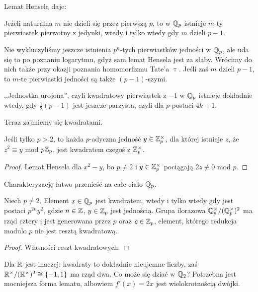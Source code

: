 Lemat Hensela daje:

\begin{fakt}
	Jeżeli naturalna $m$ nie dzieli się przez pierwszą $p$, to w $\mathbb Q_p$ istnieje $m$-ty pierwiastek pierwotny z jedynki, wtedy i tylko wtedy gdy $m$ dzieli $p-1$.
\end{fakt}

Nie wykluczyliśmy jeszcze istnienia $p^n$-tych pierwiastków jedności w $\mathbb Q_p$, ale uda się to po poznaniu logarytmu, gdyż sam lemat Hensela jest za słaby.
Wrócimy do nich także przy okazji poznania homomorfizmu Tate'a $\uptau$.
Jeśli zaś $m$ dzieli $p-1$, to $m$-te pierwiastki jedności są także $(p-1)$-szymi.

,,Jednostka urojona'',  czyli kwadratowy pierwiastek z $-1$ w $\mathbb Q_p$ istnieje dokładnie wtedy, gdy $\frac 1 2(p-1)$ jest jeszcze parzysta, czyli dla $p$ postaci $4k+1$.

Teraz zajmiemy się kwadratami.

\begin{fakt}
	Jeśli tylko $p > 2$, to każda $p$-adyczna jedność $y \in \mathbb Z_p^\times$, dla której istnieje $z$, że $z^2 \equiv y$ mod $p \mathbb Z_p$, jest kwadratem czegoś z $\mathbb Z_p^\times$.
\end{fakt}

\begin{proof}
	Lemat Hensela dla $x^2 - y$, bo $p \neq 2$ i $y \in \mathbb Z_p^\times$ pociągają $2 z \not\equiv 0$ mod $p$.
\end{proof}

Charakteryzację łatwo przenieść na całe ciało $\mathbb Q_p$.

\begin{wniosek}
	Niech  $p \neq 2$. 
	Element $x \in \mathbb Q_p$ jest kwadratem, wtedy i tylko wtedy gdy jest postaci $p^{2n} y^2$, gdzie $n \in \mathbb Z$, $y \in \mathbb Z_p$ jest jednością.
	Grupa ilorazowa $\mathbb Q_p^\times / (\mathbb Q_p^\times)^2$ ma rząd cztery i jest generowana przez $p$ oraz $c \in \mathbb Z_p$, element, którego redukcja modulo $p$ nie jest resztą kwadratową.
\end{wniosek}

\begin{proof}
	Własności reszt kwadratowych.
\end{proof}

Dla $\mathbb R$ jest inaczej: kwadraty to dokładnie nieujemne liczby, zaś $\mathbb R^\times/(\mathbb R^\times)^2 \cong \{-1, 1\}$ ma rząd dwa.
Co może się dziać w $\mathbb Q_2$?
Potrzebna jest mocniejsza forma lematu, albowiem $f'(x) = 2x$ jest wielokrotnością dwójki.

